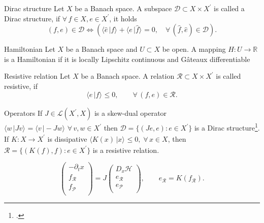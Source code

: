 \documentclass[aspectratio=169]{beamer}
\newcommand{\bbR}{\mathbb{R}}
\newcommand{\dualpr}[3][]{\ensuremath{\langle #2 \, \vert #3 \rangle_{#1}}}
\begin{document}
\begin{frame}
	\begin{block}{Dirac structure}
			Let $X$ be a Banach space. A subspace $\mathcal{D}\subset X \times X^{'}$ is called a Dirac structure, if $\forall \, f \in X, e \in X^{'}$, it holds
			\begin{equation*}
				(f, e) \in \mathcal{D} \iff \left( \dualpr{\widehat{e}}{f} + \dualpr{e}{\widehat{f}}=0, \quad \forall\, (\widehat{f}, \widehat{e}) \in \mathcal{D}\right).
			\end{equation*}
		\end{block}

		\begin{block}{Hamiltonian}
			Let $X$ be a Banach space and $U \subset X$ be open. A mapping ${H} : U \rightarrow \bbR$ is a Hamiltonian if it is locally Lipschitz continuous and G\^{a}teaux differentiable
		\end{block}
		
		\begin{block}{Resistive relation}
			Let $X$ be a Banach space.
			A relation $\mathcal{R} \subset X \times X^{'}$ is called resistive, if
			\begin{equation*}
				\dualpr{e}{f} \le 0, \qquad \forall\, (f,e) \in \mathcal{R}.
			\end{equation*}
		
		\end{block}

\end{frame}

\begin{frame}{Operators}
	If $J \in \mathcal{L}(X^{'}, X)$ is a skew-dual operator $\dualpr{w}{J v}= \dualpr{v}{-Jw}\; \forall\, v, w \in X^{'}$ then $\mathcal{D} = \{(J e, e) : e \in X^{'}\}$ is a Dirac structure\footcite{reis2022passivity}.\\
	\vspace{.2cm}
	If $K :X \rightarrow X^{'}$ is dissipative $\dualpr{K(x)}{x} \le 0,\; \forall \, x \in X$, then $\mathcal{R} = \{(K(f), f) : e \in X^{'}\}$ is a resistive relation.
	
	\begin{equation*}
		\begin{pmatrix}
			-\partial_t x \\
			f_\mathcal{R} \\
			f_\mathcal{P} \\
		\end{pmatrix} =
		J
		\begin{pmatrix}
			D_x\mathcal{H} \\
			e_\mathcal{R} \\
			e_\mathcal{P} \\
		\end{pmatrix}, \qquad e_{\mathcal{R}} = K(f_{\mathcal{R}}).
	\end{equation*}
\end{frame}
\end{document}
